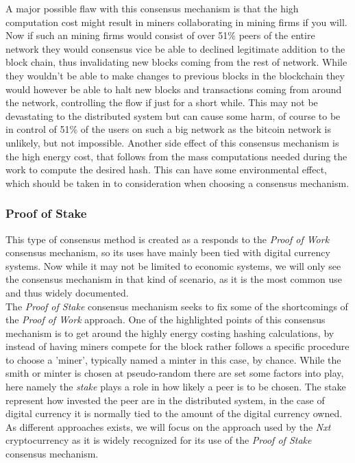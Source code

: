 \documentclass[paper=a4, fontsize=11pt]{scrartcl} %
\numberwithin{equation}{section} %
\numberwithin{figure}{section} %
\numberwithin{table}{section} %
\begin{document}
 A major possible flaw with this consensus mechanism is that the high computation cost might result in miners collaborating in mining firms if you will. Now if such an mining firms would consist of over 51\% peers of the entire network they would consensus vice be able to declined legitimate addition to the block chain, thus invalidating new blocks coming from the rest of network. While they wouldn't be able to make changes to previous blocks in the blockchain they would however be able to halt new blocks and transactions coming from around the network, controlling the flow if just for a short while. This may not be devastating to the distributed system but can cause some harm, of course to be in control of 51\% of the users on such a big network as the bitcoin network is unlikely, but not impossible\cite{51}. Another side effect of this consensus mechanism is the high energy cost, that follows from the mass computations needed during the work to compute the desired hash. This can have some environmental effect, which should be taken in to consideration when choosing a consensus mechanism.

\subsubsection{Proof of Stake}

This type of consensus method is created as a responds to the \textit{Proof of Work} consensus mechanism, so its uses have mainly been tied with digital currency systems. Now while it may not be limited to economic systems, we will only see the consensus mechanism in that kind of scenario, as it is the most common use and thus widely documented. \\ 

The \textit{Proof of Stake} consensus mechanism seeks to fix some of the shortcomings of the \textit{Proof of Work} approach. One of the highlighted points of this consensus mechanism is to get around the highly energy costing hashing calculations, by instead of having miners compete for the block rather follows a specific procedure to choose a 'miner', typically named a minter in this case, by chance. While the smith or minter is chosen at pseudo-random there are set some factors into play, here namely the \textit{stake} plays a role in how likely a peer is to be chosen. The stake represent how invested the peer are in the distributed system, in the case of digital currency it is normally tied to the amount of the digital currency owned. As different approaches exists, we will focus on the approach used by the \textit{Nxt}\cite{nxt} cryptocurrency as it is widely recognized for its use of the \textit{Proof of Stake} consensus mechanism.\\
\end{document}
